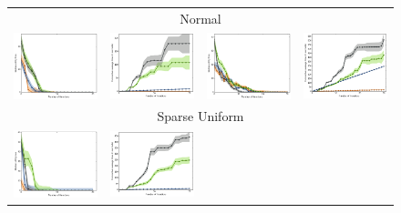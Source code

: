 \documentclass{article}
\renewcommand\[{\begin{equation}}
\renewcommand\]{\end{equation}}
\begin{document}
\begin{figure}[b]
{\begin{tabular}{cccc}
        \\
        \hline
        \multicolumn{4}{c}{{\sc Normal}}
        \\
        \includegraphics[width=10em]{figures/synthetic_vs_others_3_normal_per_iter_loss} &
        \includegraphics[width=10em]{figures/synthetic_vs_others_3_normal_per_iter_time} &
        \includegraphics[width=10em]{figures/synthetic_vs_others_4_normal_per_iter_loss} &
        \includegraphics[width=10em]{figures/synthetic_vs_others_4_normal_per_iter_time}
        \\
        \hline
        \multicolumn{4}{c}{{\sc Sparse Uniform}}
        \\
        \includegraphics[width=10em]{figures/synthetic_vs_others_3_uniform_sparse_per_iter_loss} &
        \includegraphics[width=10em]{figures/synthetic_vs_others_3_uniform_sparse_per_iter_time} &

\end{tabular}}
\end{figure}
\end{document}
